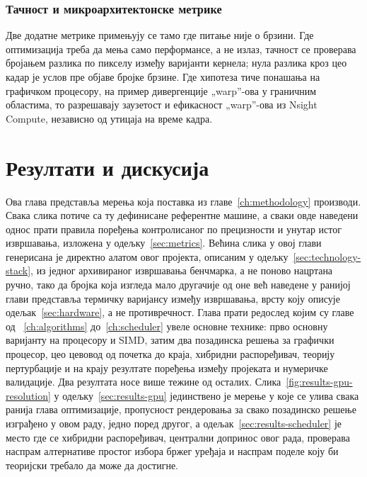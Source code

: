 \documentclass[serbian]{ftndiplomski}
\begin{document}
\subsection{Тачност и микроархитектонске метрике}
\label{sec:correctness-metrics}

Две додатне метрике примењују се тамо где питање није о брзини. Где оптимизација
треба да мења само перформансе, а не излаз, тачност се проверава бројањем разлика по
пикселу између варијанти кернела; нула разлика кроз цео кадар је услов пре објаве
бројке брзине. Где хипотеза тиче понашања на графичком процесору, на пример
дивергенције „warp''-ова у граничним областима, то разрешавају заузетост и
ефикасност „warp''-ова из Nsight Compute, независно од утицаја на време кадра.

\chapter{Резултати и дискусија}
\label{ch:results}

Ова глава представља мерења која поставка из главе~\ref{ch:methodology} производи.
Свака слика потиче са ту дефинисане референтне машине, а сваки овде наведени однос
прати правила поређења контролисаног по прецизности и унутар истог извршавања,
изложена у одељку~\ref{sec:metrics}. Већина слика у овој глави генерисана је директно
алатом  овог пројекта, описаним у
одељку~\ref{sec:technology-stack}, из једног архивираног извршавања бенчмарка, а не
поново нацртана ручно, тако да бројка која изгледа мало другачије од оне већ наведене
у ранијој глави представља термичку варијансу између извршавања, врсту коју описује
одељак~\ref{sec:hardware}, а не противречност. Глава прати редослед којим су главе од
~\ref{ch:algorithms} до~\ref{ch:scheduler} увеле основне технике: прво основну
варијанту на процесору и SIMD, затим два позадинска решења за графички процесор, цео
цевовод од почетка до краја, хибридни распоређивач, теорију пертурбације и на крају
резултате поређења између пројеката и нумеричке валидације. Два резултата носе више
тежине од осталих. Слика~\ref{fig:results-gpu-resolution} у одељку~\ref{sec:results-gpu}
јединствено је мерење у које се улива свака ранија глава оптимизације, пропусност
рендеровања за свако позадинско решење изграђено у овом раду, једно поред другог, а
одељак~\ref{sec:results-scheduler} је место где се хибридни распоређивач, централни
допринос овог рада, проверава наспрам алтернативе простог избора бржег уређаја и
наспрам поделе коју би теоријски требало да може да достигне.
\end{document}
